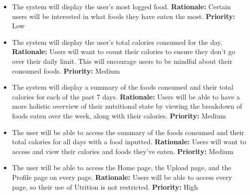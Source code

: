 \documentclass[12pt]{article}
\newcounter{FRCounter}
\newcommand{\FillFRNumber}{\textbf{FR\arabic{FRCounter}.} \stepcounter{FRCounter}}
\begin{document}
\begin{itemize}
	\item [\FillFRNumber] The system will display the user's most logged food. \newline
	\textbf{Rationale:} Certain users will be interested in what foods they have eaten the most. \newline
	\textbf{Priority:} Low
\end{itemize}

\begin{itemize}
	\item [\FillFRNumber] The system will display the user's total calories consumed for the day. \newline
	\textbf{Rationale:} Users will want to count their calories to ensure they don't go over their daily limit. This will encourage users to be mindful about their consumed foods.\newline
	\textbf{Priority:} Medium
\end{itemize}

\begin{itemize}
	\item [\FillFRNumber] The system will display a summary of the foods consumed and their total calories for each of the past 7 days. \newline
	\textbf{Rationale:} Users will be able to have a more holistic overview of their nutritional state by viewing the breakdown of foods eaten over the week, along with their calories. \newline
	\textbf{Priority:} Medium
\end{itemize}

\begin{itemize}
	\item [\FillFRNumber] The user will be able to access the summary of the foods consumed and their total calories for all days with a food inputted. \newline
	\textbf{Rationale:}  Users will want to access and view their calories and foods they've eaten. \newline
	\textbf{Priority:} Medium
\end{itemize}

\begin{itemize}
	\item [\FillFRNumber] The user will be able to access the Home page, the Upload page, and the Profile page on every page. \newline
	\textbf{Rationale:}  Users will be able to access every page, so their use of Utrition is not restricted. \newline
	\textbf{Priority:} High
\end{itemize}
\end{document}
